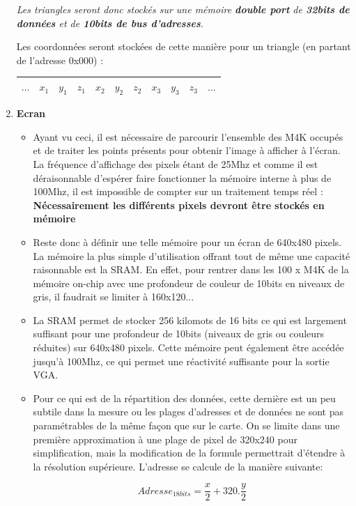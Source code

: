 \documentclass[10pt,a4paper]{article}
\begin{document}
\begin{enumerate}
\begin{itemize}
\end{itemize}
\emph{Les triangles seront donc stockés sur une mémoire \textbf{double port} de \textbf{32bits de données} et de \textbf{10bits de bus d'adresses}.}

Les coordonnées seront stockées de cette manière pour un triangle (en partant de l'adresse 0x000) :
\begin{center}
\begin{tabular}{|c|c|c|c|c|c|c|c|c|c|c|}
\hline 
$\ldots$ & $x_1$ & $y_1$ & $z_1$ & $x_2$ & $y_2$ & $z_2$ & $x_3$ & $y_3$ & $z_3$ & $\ldots$ \\ 
\hline 
\end{tabular} 
\end{center}

\item \textbf{Ecran}
\begin{itemize}
\item Ayant vu ceci, il est nécessaire de parcourir l'ensemble des M4K occupés et de traiter les points présents pour obtenir l'image à afficher à l'écran. La fréquence d'affichage des pixels étant de 25Mhz et comme il est déraisonnable d'espérer faire fonctionner la mémoire interne à plus de 100Mhz, il est impossible de compter sur un traitement temps réel : \textbf{Nécessairement les différents pixels devront être stockés en mémoire}

\item Reste donc à définir une telle mémoire pour un écran de 640x480 pixels. La mémoire la plus simple d'utilisation offrant tout de même une capacité raisonnable est la SRAM. En effet, pour rentrer dans les 100 x M4K de la mémoire on-chip avec une profondeur de couleur de 10bits en niveaux de gris, il faudrait se limiter à 160x120...

\item La SRAM permet de stocker 256 kilomots de 16 bits ce qui est largement suffisant pour une profondeur de 10bits (niveaux de gris ou couleurs réduites) sur 640x480 pixels. Cette mémoire peut également être accédée jusqu'à 100Mhz, ce qui permet une réactivité suffisante pour la sortie VGA.

\item Pour ce qui est de la répartition des données, cette dernière est un peu subtile dans la mesure ou les plages d'adresses et de données ne sont pas paramétrables de la même façon que sur le carte. On se limite dans une première approximation à une plage de pixel de 320x240 pour simplification, mais la modification de la formule permettrait d'étendre à la résolution supérieure. L'adresse se calcule de la manière suivante:

\[ Adresse_{18bits} = \frac{x}{2} + 320 . \frac{y}{2} \]

\end{itemize}
\end{enumerate}
\end{document}
